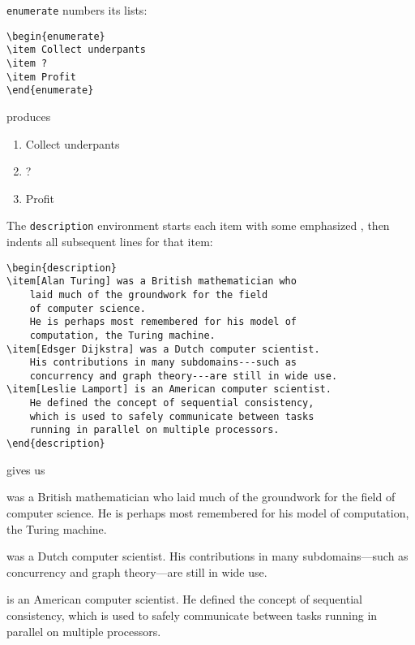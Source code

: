 \bigskip
\noindent \texttt{enumerate} numbers its lists:
\begin{leftfigure}
\begin{lstlisting}
\begin{enumerate}
\item Collect underpants
\item ?
\item Profit
\end{enumerate}
\end{lstlisting}
\end{leftfigure}
produces
\begin{leftfigure}
\lm%
\begin{enumerate}[leftmargin=*]
\item Collect underpants
\item ?
\item Profit
\end{enumerate}
\end{leftfigure}

\bigskip
\noindent The \texttt{description} environment starts each item with some
emphasized ,
then indents all subsequent lines for that item:
\begin{leftfigure}
\begin{lstlisting}
\begin{description}
\item[Alan Turing] was a British mathematician who
    laid much of the groundwork for the field
    of computer science.
    He is perhaps most remembered for his model of
    computation, the Turing machine.
\item[Edsger Dijkstra] was a Dutch computer scientist.
    His contributions in many subdomains---such as
    concurrency and graph theory---are still in wide use.
\item[Leslie Lamport] is an American computer scientist.
    He defined the concept of sequential consistency,
    which is used to safely communicate between tasks
    running in parallel on multiple processors.
\end{description}
\end{lstlisting}
\end{leftfigure}
gives us
\begin{leftfigure}
\lm%
\begin{description}[leftmargin=*]
\item[\lm Alan Turing] was a British mathematician who
    laid much of the groundwork for the field
    of computer science.
    He is perhaps most remembered for his model of computation,
    the Turing machine.
\item[\lm Edsger Dijkstra] was a Dutch computer scientist.
    His contributions in many subdomains---such as
    concurrency and graph theory---are still in wide use.
\item[\lm Leslie Lamport] is an American computer scientist.
    He defined the concept of sequential consistency,
    which is used to safely communicate between tasks
    running in parallel on multiple processors.
\end{description}
\end{leftfigure}

